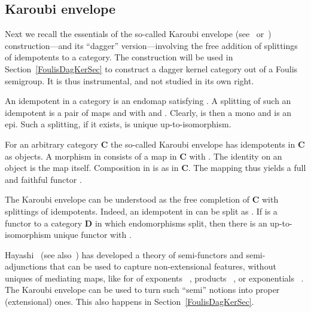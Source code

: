 \documentclass{article}
\newif\ifignore \ignorefalse
\newcommand{\auxproof}[1]{
\ifignore\mbox{}\newline
\textbf{PROOF:} \dotfill\newline
{\it #1}\mbox{}\newline
\textbf{ENDPROOF}\dotfill
\fi}
\newcommand{\Cat}[1]{\ensuremath{\mathbf{#1}}}
\begin{document}
\subsection{Karoubi envelope}\label{KaroubiSubsec}

Next we recall the essentials of the so-called Karoubi envelope
(see~\cite{Karoubi78} or~\cite[Chapter~2, Exercise~B]{Freyd64})
construction---and its ``dagger'' version---involving the free
addition of splittings of idempotents to a category. The construction
will be used in Section~\ref{FoulisDagKerSec} to construct a dagger
kernel category out of a Foulis semigroup. It is thus instrumental,
and not studied in its own right.

An idempotent in a category is an endomap 
satisfying . A splitting of such an idempotent  is a
pair of maps  and 
with  and . Clearly,  is then
a mono and  is an epi. Such a splitting, if it exists, is unique
up-to-isomorphism.

\auxproof{
Assume also 
with . Then ,
so that:


\noindent Hence the maps 
and  are each other's
inverses:

}

For an arbitrary category \Cat{C} the so-called Karoubi envelope
 has idempotents  in
\Cat{C} as objects. A morphism  in
 consists of a map  in
\Cat{C} with . The identity on an object
 is the map  itself. Composition in
 is as in \Cat{C}. The mapping  thus yields a full and faithful functor .

The Karoubi envelope  can be understood as the free
completion of \Cat{C} with splittings of idempotents. Indeed, an
idempotent  in  can
be split as . If  is a functor to a category \Cat{D} in
which endomorphisms split, then there is an up-to-isomorphism unique
functor  with
.

\auxproof{
For an object , define  via the splitting
in \Cat{D}:


\noindent For  we take
.  Then:


\noindent This  is unique up-to-isomorphism: each
idempotent  can be understood as a 
splitting in , namely of:


\noindent Since  preserves splittings and satisfies
, we get the definition as
described above.
}

Hayashi~\cite{Hayashi85} (see also~\cite{HoofmanM95}) has developed a
theory of semi-functors and semi-adjunctions that can be used to
capture non-extensional features, without uniques of mediating maps,
like for of exponents ~\cite{Scott80a,LambekS86},
products ~\cite{Jacobs91b}, or exponentials
~\cite{Hoofman92}. The Karoubi envelope can be used to turn such
``semi'' notions into proper (extensional) ones. This also happens in
Section~\ref{FoulisDagKerSec}.
\end{document}
